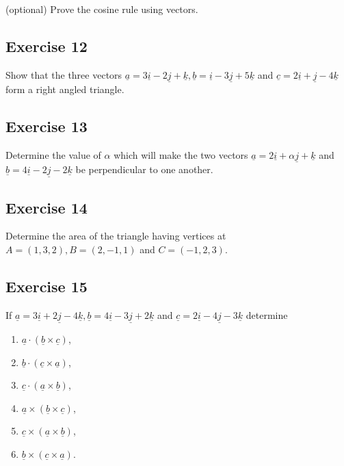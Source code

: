 \documentclass[
  11pt,
  oneside]{book}
\providecommand{\tightlist}{%
  \setlength{\itemsep}{0pt}\setlength{\parskip}{0pt}}
\newcommand{\slide}{}
\theoremstyle{definition}
\theoremstyle{definition}
\theoremstyle{definition}
\theoremstyle{definition}
\theoremstyle{remark}
\begin{document}
(optional) Prove the cosine rule using vectors.

\slide

\subsection*{Exercise 12}\label{exercise-12}

Show that the three vectors \(\underline{a} = 3\underline{i} - 2\underline{j} + \underline{k}, \underline{b} = \underline{i} - 3\underline{j} + 5\underline{k}\) and \(\underline{c}= 2\underline{i} + \underline{j} - 4\underline{k}\) form a right angled triangle.

\slide

\subsection*{Exercise 13}\label{exercise-13}

Determine the value of \(\alpha\) which will make the two vectors \(\underline{a} = 2\underline{i} + \alpha\underline{j} + \underline{k}\) and \(\underline{b} = 4\underline{i} - 2\underline{j} - 2\underline{k}\) be perpendicular to one another.

\slide

\subsection*{Exercise 14}\label{exercise-14}

Determine the area of the triangle having vertices at \(A=(1,3,2), B=(2, -1,1)\) and \(C=(-1,2,3)\).

\slide

\subsection*{Exercise 15}\label{exercise-15}

If \(\underline{a} = 3\underline{i} + 2\underline{j} - 4\underline{k}, \underline{b} = 4\underline{i} - 3\underline{j} + 2\underline{k}\) and \(\underline{c} = 2\underline{i} - 4\underline{j} - 3\underline{k}\) determine

\begin{enumerate}
\def\labelenumi{\roman{enumi}.}
\tightlist
\item
  \(\underline{a} \cdot (\underline{b} \times \underline{c})\),
\item
  \(\underline{b} \cdot (\underline{c} \times \underline{a})\),
\item
  \(\underline{c} \cdot (\underline{a} \times \underline{b})\),
\item
  \(\underline{a} \times (\underline{b} \times \underline{c})\),
\item
  \(\underline{c} \times (\underline{a} \times \underline{b})\),
\item
  \(\underline{b} \times (\underline{c} \times \underline{a})\).
\end{enumerate}
\end{document}
